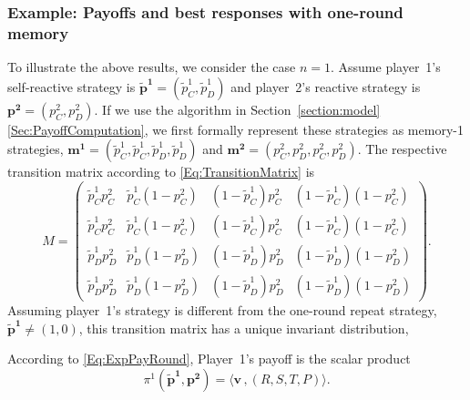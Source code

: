 \documentclass[9pt,twoside,lineno]{pnas-new}
\theoremstyle{plainCl1}
\theoremstyle{plainCl2}
\begin{document}
\subsubsection*{Example: Payoffs and best responses with one-round memory}
To illustrate the above results, we consider the case $n\!=\!1$. 
Assume player~1's self-reactive strategy is $\mathbf{\tilde p^1} \!=\! (\tilde p_C^1, \tilde p_D^1)$ and player~2's reactive strategy is $\mathbf{p^2} \!=\! (p^2_C, p^2_D)$. 
If we use the algorithm in Section~\ref{section:model}\ref{Sec:PayoffComputation}, we first formally represent these strategies as memory-1 strategies, $\mathbf{m^1} = (\tilde p_C^1, \tilde p_C^1,  \tilde p_D^1,  \tilde p_D^1)$ and $\mathbf{m^2} = (p_C^2, p_D^2,  p_C^2,  p_D^2)$.
The respective transition matrix according to \eqref{Eq:TransitionMatrix} is
\begin{equation} \label{Eq:TransitionM1}
M=\left(
\begin{array}{cccc}
\tilde p^1_C p^2_C	&\tilde p^1_C(1\!-\!p^2_C)	&(1\!-\!\tilde p^1_C)p^2_C	&(1\!-\!\tilde p^1_C)(1\!-\!p^2_C)\\
\tilde p^1_C p^2_C	&\tilde p^1_C(1\!-\!p^2_C)	&(1\!-\!\tilde p^1_C)p^2_C	&(1\!-\!\tilde p^1_C)(1\!-\!p^2_C)\\
\tilde p^1_D p^2_D	&\tilde p^1_D(1\!-\!p^2_D)	&(1\!-\!\tilde p^1_D)p^2_D	&(1\!-\!\tilde p^1_D)(1\!-\!p^2_D)\\
\tilde p^1_D p^2_D	&\tilde p^1_D(1\!-\!p^2_D)	&(1\!-\!\tilde p^1_D)p^2_D	&(1\!-\!\tilde p^1_D)(1\!-\!p^2_D)
\end{array}
\right).
\end{equation}
Assuming player~1's strategy is different from the one-round repeat strategy, $\mathbf{\tilde p^1} \!\neq\! (1,0)$, this transition matrix has a unique invariant distribution,
{\begin{center}
\end{center}}
\noindent
According to \eqref{Eq:ExpPayRound}, Player~1's payoff is the scalar product 
\begin{equation} \label{Eq:PayExample}
\pi^1(\mathbf{\tilde p^1},\mathbf{p^2})=\big\langle\mathbf{v}\, , (R,S,T,P)\big\rangle.
\end{equation} 
\end{document}

